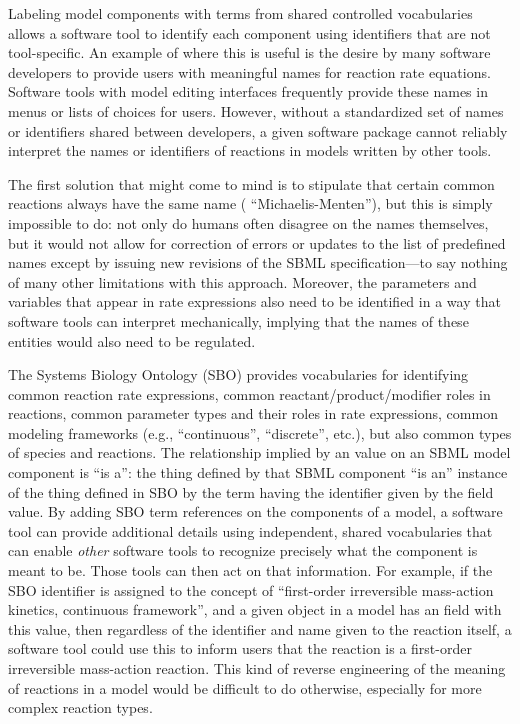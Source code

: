 Labeling model components with terms from shared controlled
vocabularies allows a software tool to identify each component using
identifiers that are not tool-specific.  An example of where this
is useful is the desire by many software developers to provide
users with meaningful names for reaction rate equations.  Software
tools with model editing interfaces frequently provide these names
in menus or lists of choices for users.  However, without a
standardized set of names or identifiers shared between
developers, a given software package cannot reliably interpret the
names or identifiers of reactions in models written by other
tools.

The first solution that might come to mind is to stipulate that
certain common reactions always have the same name (\eg
``Michaelis-Menten''), but this is simply impossible to do: not
only do humans often disagree on the names themselves, but it
would not allow for correction of errors or updates to the list of
predefined names except by issuing new revisions of the SBML
specification---to say nothing of many other limitations with this
approach.  Moreover, the parameters and variables that appear in
rate expressions also need to be identified in a way that software
tools can interpret mechanically, implying that the names of these
entities would also need to be regulated.

The Systems Biology Ontology (SBO) provides vocabularies for
identifying common reaction rate expressions, common
reactant/product/modifier roles in reactions, common parameter
types and their roles in rate expressions, common modeling
frameworks (e.g., ``continuous'', ``discrete'', etc.), but also common types of species and reactions.  The
relationship implied by an  value on an SBML model
component is ``is a'': the thing defined by that SBML component
``is an'' instance of the thing defined in SBO by the term having the
identifier given by the  field value.  By adding
SBO term references on the components of a model, a software tool
can provide additional details using independent, shared
vocabularies that can enable \emph{other} software tools to
recognize precisely what the component is meant to be.  Those
tools can then act on that information.  For example, if the SBO
identifier  is assigned to the concept of
``first-order irreversible mass-action kinetics, continuous
framework'', and a given \KineticLaw object in a model has an
 field with this value, then regardless of the
identifier and name given to the reaction itself, a software tool
could use this to inform users that the reaction is a first-order
irreversible mass-action reaction.  This kind of reverse
engineering of the meaning of reactions in a model would be
difficult to do otherwise, especially for more complex reaction
types.

